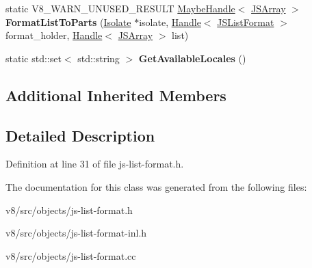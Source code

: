 \begin{DoxyCompactItemize}
\item 
\mbox{\label{classv8_1_1internal_1_1JSListFormat_a26c8a3114953f94166c8383afee83088}} 
static V8\+\_\+\+W\+A\+R\+N\+\_\+\+U\+N\+U\+S\+E\+D\+\_\+\+R\+E\+S\+U\+LT \mbox{\hyperlink{classv8_1_1internal_1_1MaybeHandle}{Maybe\+Handle}}$<$ \mbox{\hyperlink{classv8_1_1internal_1_1JSArray}{J\+S\+Array}} $>$ {\bfseries Format\+List\+To\+Parts} (\mbox{\hyperlink{classv8_1_1internal_1_1Isolate}{Isolate}} $\ast$isolate, \mbox{\hyperlink{classv8_1_1internal_1_1Handle}{Handle}}$<$ \mbox{\hyperlink{classv8_1_1internal_1_1JSListFormat}{J\+S\+List\+Format}} $>$ format\+\_\+holder, \mbox{\hyperlink{classv8_1_1internal_1_1Handle}{Handle}}$<$ \mbox{\hyperlink{classv8_1_1internal_1_1JSArray}{J\+S\+Array}} $>$ list)
\item 
\mbox{\label{classv8_1_1internal_1_1JSListFormat_adf3eb80bc26ceee6be8c399b60303b88}} 
static std\+::set$<$ std\+::string $>$ {\bfseries Get\+Available\+Locales} ()
\end{DoxyCompactItemize}
\subsection*{Additional Inherited Members}


\subsection{Detailed Description}


Definition at line 31 of file js-\/list-\/format.\+h.



The documentation for this class was generated from the following files\+:\begin{DoxyCompactItemize}
\item 
v8/src/objects/js-\/list-\/format.\+h\item 
v8/src/objects/js-\/list-\/format-\/inl.\+h\item 
v8/src/objects/js-\/list-\/format.\+cc\end{DoxyCompactItemize}
